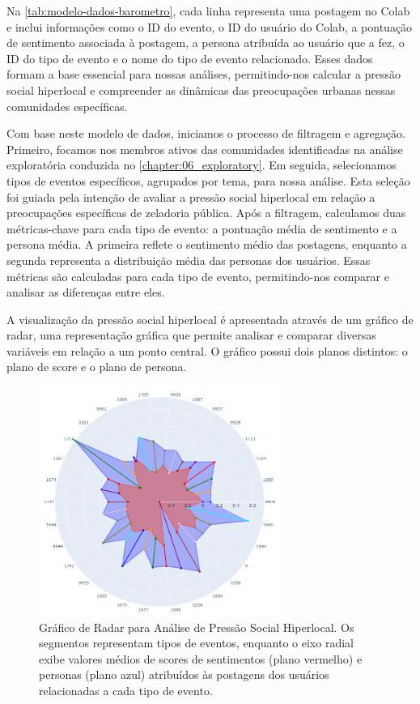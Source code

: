 Na \autoref{tab:modelo-dados-barometro}, cada linha representa uma postagem no Colab e inclui informações como o ID do evento, o ID do usuário do Colab, a pontuação de sentimento associada à postagem, a persona atribuída ao usuário que a fez, o ID do tipo de evento e o nome do tipo de evento relacionado. Esses dados formam a base essencial para nossas análises, permitindo-nos calcular a pressão social hiperlocal e compreender as dinâmicas das preocupações urbanas nessas comunidades específicas.

Com base neste modelo de dados, iniciamos o processo de filtragem e agregação. Primeiro, focamos nos membros ativos das comunidades identificadas na análise exploratória conduzida no \autoref{chapter:06_exploratory}. Em seguida, selecionamos tipos de eventos específicos, agrupados por tema, para nossa análise. Esta seleção foi guiada pela intenção de avaliar a pressão social hiperlocal em relação a preocupações específicas de zeladoria pública. Após a filtragem, calculamos duas métricas-chave para cada tipo de evento: a pontuação média de sentimento e a persona média. A primeira reflete o sentimento médio das postagens, enquanto a segunda representa a distribuição média das personas dos usuários. Essas métricas são calculadas para cada tipo de evento, permitindo-nos comparar e analisar as diferenças entre eles.

A visualização da pressão social hiperlocal é apresentada através de um gráfico de radar, uma representação gráfica que permite analisar e comparar diversas variáveis em relação a um ponto central. O gráfico possui dois planos distintos: o plano de score e o plano de persona.

\begin{figure}[htb]
	\centering
	\includegraphics[width=0.7\textwidth]{images/social_barometer_plot.png}
	\caption{Gráfico de Radar para Análise de Pressão Social Hiperlocal. Os segmentos representam tipos de eventos, enquanto o eixo radial exibe valores médios de scores de sentimentos (plano vermelho) e personas (plano azul) atribuídos às postagens dos usuários relacionadas a cada tipo de evento.}
	\label{fig:social_barometer_plot}
\end{figure}

